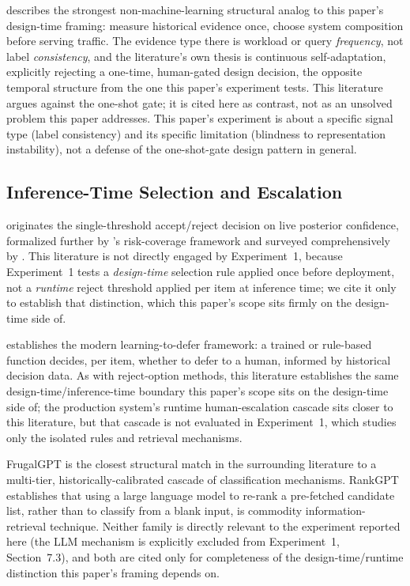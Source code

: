 \documentclass[11pt]{article}
\begin{document}
\citet{idreoskraska2019} describes the strongest non-machine-learning
structural analog to this paper's design-time framing: measure historical
evidence once, choose system composition before serving traffic. The
evidence type there is workload or query \emph{frequency}, not label
\emph{consistency}, and the literature's own thesis is continuous
self-adaptation, explicitly rejecting a one-time, human-gated design
decision, the opposite temporal structure from the one this paper's
experiment tests. This literature argues against the one-shot gate; it is
cited here as contrast, not as an unsolved problem this paper addresses.
This paper's experiment is about a specific signal type
(label consistency) and its specific limitation (blindness to representation
instability), not a defense of the one-shot-gate design pattern in general.

\subsection{Inference-Time Selection and Escalation}
\label{sec:inference-time-selection}

\citet{chow1970} originates the single-threshold accept/reject decision on
live posterior confidence, formalized further by \citet{elyaniv2010}'s
risk-coverage framework and surveyed comprehensively by
\citet{hendrickx2024}. This literature is not directly engaged by
Experiment~1, because Experiment~1 tests a \emph{design-time}
selection rule applied once before deployment, not a \emph{runtime} reject
threshold applied per item at inference time; we cite it only to establish
that distinction, which this paper's scope sits firmly on the design-time
side of.

\citet{mozannarsontag2020} establishes the modern learning-to-defer
framework: a trained or rule-based function decides, per item, whether to
defer to a human, informed by historical decision data. As with
reject-option methods, this literature establishes the same
design-time/inference-time boundary this paper's scope sits on the design-time
side of; the production system's runtime human-escalation cascade sits closer
to this literature, but that cascade is not evaluated in Experiment~1, which
studies only the isolated rules and retrieval mechanisms.

FrugalGPT \citep{frugalgpt2023} is the closest structural match in the
surrounding literature to a multi-tier, historically-calibrated cascade of
classification mechanisms. RankGPT \citep{rankgpt2023} establishes that
using a large language model to re-rank a pre-fetched candidate list, rather
than to classify from a blank input, is commodity information-retrieval
technique. Neither family is directly relevant to the
experiment reported here (the LLM mechanism is explicitly excluded from
Experiment~1, Section~7.3), and both are cited only for completeness of the
design-time/runtime distinction this paper's framing depends on.
\end{document}

